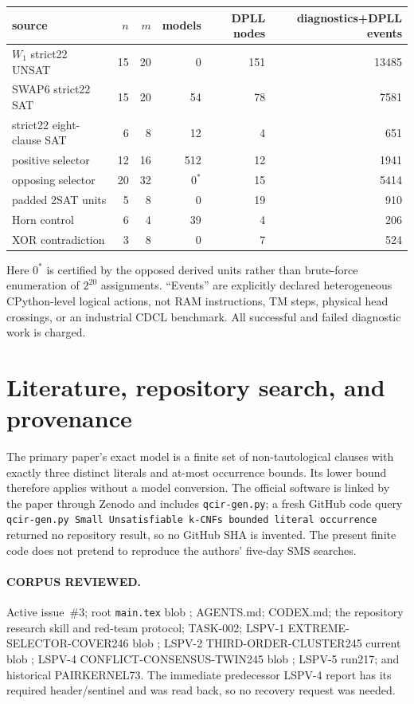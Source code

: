 \documentclass[10pt]{article}
\begin{document}
\begin{center}\small
\begin{tabular}{lrrrrr}
\toprule
source & $n$ & $m$ & models & DPLL nodes & diagnostics+DPLL events\\\midrule
$W_1$ strict22 UNSAT &15&20&0&151&13485\\
SWAP6 strict22 SAT &15&20&54&78&7581\\
strict22 eight-clause SAT &6&8&12&4&651\\
positive selector &12&16&512&12&1941\\
opposing selector &20&32&$0^\ast$&15&5414\\
padded 2SAT units &5&8&0&19&910\\
Horn control &6&4&39&4&206\\
XOR contradiction &3&8&0&7&524\\
\bottomrule
\end{tabular}
\end{center}
Here $0^\ast$ is certified by the opposed derived units rather than brute-force
enumeration of $2^{20}$ assignments.  ``Events'' are explicitly declared
heterogeneous CPython-level logical actions, not RAM instructions, TM steps,
physical head crossings, or an industrial CDCL benchmark.  All successful
and failed diagnostic work is charged.

\section{Literature, repository search, and provenance}
The primary paper's exact model is a finite set of non-tautological clauses
with exactly three distinct literals and at-most occurrence bounds.  Its lower
bound therefore applies without a model conversion.  The official software
is linked by the paper through Zenodo and includes \texttt{qcir-gen.py}; a
fresh GitHub code query
\texttt{qcir-gen.py Small Unsatisfiable k-CNFs bounded literal occurrence}
returned no repository result, so no GitHub SHA is invented.  The present
finite code does not pretend to reproduce the authors' five-day SMS searches.

\paragraph{CORPUS REVIEWED.}
Active issue~\#3; root \texttt{main.tex} blob
; AGENTS.md; CODEX.md;
the repository research skill and red-team protocol; TASK-002; LSPV-1
EXTREME-SELECTOR-COVER246 blob
; LSPV-2
THIRD-ORDER-CLUSTER245 current blob
; LSPV-4
CONFLICT-CONSENSUS-TWIN245 blob
; LSPV-5 run217;
and historical PAIRKERNEL73.  The immediate predecessor LSPV-4 report has its
required header/sentinel and was read back, so no recovery request was needed.
\end{document}
